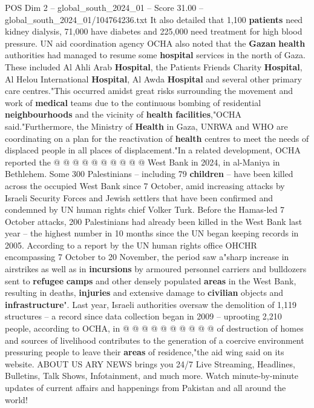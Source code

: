 \begin{textsample}{POS Dim 2 – global\_south\_2024\_01 – Score 31.00 – global\_south\_2024\_01/104764236.txt}
It also detailed that 1,100 \textbf{patients} need kidney dialysis, 71,000 have diabetes and 225,000 need treatment for high blood pressure.
UN aid coordination agency OCHA also noted that the \textbf{Gazan} \textbf{health} authorities had managed to resume some \textbf{hospital} services in the north of Gaza.
These included Al Ahli Arab \textbf{Hospital}, the Patients Friends Charity \textbf{Hospital}, Al Helou International \textbf{Hospital}, Al Awda \textbf{Hospital} and several other primary care centres."This occurred amidst great risks surrounding the movement and work of \textbf{medical} teams due to the continuous bombing of residential \textbf{neighbourhoods} and the vicinity of \textbf{health} \textbf{facilities},"OCHA said."Furthermore, the Ministry of \textbf{Health} in Gaza, UNRWA and WHO are coordinating on a plan for the reactivation of \textbf{health} centres to meet the needs of displaced people in all places of displacement."In a related development, OCHA reported the @ @ @ @ @ @ @ @ @ @ West Bank in 2024, in al-Maniya in Bethlehem.
Some 300 Palestinians -- including 79 \textbf{children} -- have been killed across the occupied West Bank since 7 October, amid increasing attacks by Israeli Security Forces and Jewish settlers that have been confirmed and condemned by UN human rights chief Volker Turk.
Before the Hamas-led 7 October attacks, 200 Palestinians had already been killed in the West Bank last year -- the highest number in 10 months since the UN began keeping records in 2005.
According to a report by the UN human rights office OHCHR encompassing 7 October to 20 November, the period saw a"sharp increase in airstrikes as well as in \textbf{incursions} by armoured personnel carriers and bulldozers sent to \textbf{refugee} \textbf{camps} and other densely populated \textbf{areas} in the West Bank, resulting in deaths, \textbf{injuries} and extensive damage to \textbf{civilian} objects and \textbf{infrastructure}".
Last year, Israeli authorities oversaw the demolition of 1,119 structures -- a record since data collection began in 2009 -- uprooting 2,210 people, according to OCHA, in @ @ @ @ @ @ @ @ @ @ of destruction of homes and sources of livelihood contributes to the generation of a coercive environment pressuring people to leave their \textbf{areas} of residence,"the aid wing said on its website.
ABOUT US ARY NEWS brings you 24/7 Live Streaming, Headlines, Bulletins, Talk Shows, Infotainment, and much more.
Watch minute-by-minute updates of current affairs and happenings from Pakistan and all around the world!

\end{textsample}
